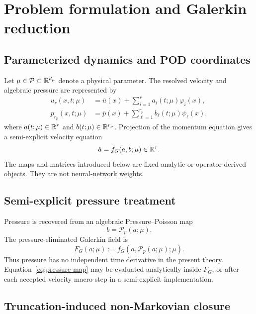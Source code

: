 \section{Problem formulation and Galerkin reduction}
\label{sec:problem}

\subsection{Parameterized dynamics and POD coordinates}
\label{sec:pod}

Let $\mu\in\mathcal{P}\subset\mathbb{R}^{d_\mu}$ denote a physical parameter. The resolved
velocity and algebraic pressure are represented by
\begin{align}
 u_r(x,t;\mu)
 &=\overline u(x)+\sum_{i=1}^{r}a_i(t;\mu)\varphi_i(x),
 \label{eq:velocity-pod}\\
 p_{r_p}(x,t;\mu)
 &=\overline p(x)+\sum_{\ell=1}^{r_p}b_\ell(t;\mu)\psi_\ell(x),
 \label{eq:pressure-pod}
\end{align}
where $a(t;\mu)\in\mathbb{R}^r$ and $b(t;\mu)\in\mathbb{R}^{r_p}$. Projection of the
momentum equation gives a semi-explicit velocity equation
\begin{equation}
 \dot a=f_G(a,b;\mu)\in\mathbb{R}^r.
 \label{eq:semiexplicit-galerkin}
\end{equation}
The maps and matrices introduced below are fixed analytic or operator-derived
objects. They are not neural-network weights.

\subsection{Semi-explicit pressure treatment}
\label{sec:pressure}

Pressure is recovered from an algebraic Pressure--Poisson map
\begin{equation}
 b=\mathcal P_p(a;\mu).
 \label{eq:pressure-map}
\end{equation}
The pressure-eliminated Galerkin field is
\begin{equation}
 F_G(a;\mu)
 :=f_G\!\left(a,\mathcal P_p(a;\mu);\mu\right).
 \label{eq:pressure-eliminated}
\end{equation}
Thus pressure has no independent time derivative in the present theory.
Equation~\eqref{eq:pressure-map} may be evaluated analytically inside
$F_G$, or after each accepted velocity macro-step in a semi-explicit
implementation.

\subsection{Truncation-induced non-Markovian closure}
\label{sec:nonmarkovian}

